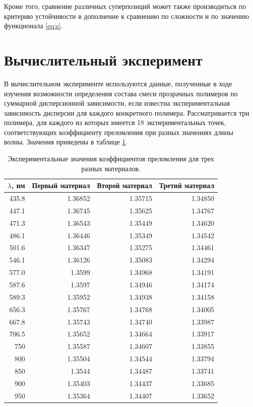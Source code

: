 \documentclass[12pt,a4paper]{article}
\theoremstyle{definition}
\begin{document}
Кроме того, сравнение различных суперпозиций может также производиться по
критерию устойчивости в дополнение к сравнению по сложности и по значению
функционала \eqref{eq:s}.

\section{Вычислительный эксперимент}

В вычислительном эксперименте используются данные, полученные в ходе
изучения возможности определения состава смеси прозрачных
полимеров по суммарной дисперсионной зависимости, если известна экспериментальная
зависимость дисперсии для каждого конкретного полимера. Рассматривается три
полимера, для каждого из которых имеется 18 экспериментальных точек,
соответствующих коэффициенту преломления при разных значениях длины волны.
Значения приведены в таблице \ref{tabl:source_data}.

\begin{table}[h]
  \begin{tabular}{| r | r | r | r |} \hline
	$\lambda$, нм	& Первый материал & Второй материал & Третий материал \\ \hline
	435.8 & 1.36852 & 1.35715 & 1.34850 \\ \hline
	447.1 & 1.36745 & 1.35625 & 1.34767 \\ \hline
	471.3 & 1.36543 & 1.35449 & 1.34620 \\ \hline
	486.1 & 1.36446 & 1.35349 & 1.34542 \\ \hline
	501.6 & 1.36347 & 1.35275 & 1.34461 \\ \hline
	546.1 & 1.36126 & 1.35083 & 1.34294 \\ \hline
	577.0 & 1.3599 & 1.34968 & 1.34191 \\ \hline
	587.6 & 1.3597 & 1.34946 & 1.34174 \\ \hline
	589.3 & 1.35952 & 1.34938 & 1.34158 \\ \hline
	656.3 & 1.35767 & 1.34768 & 1.34005 \\ \hline
	667.8 & 1.35743 & 1.34740 & 1.33987 \\ \hline
	706.5 & 1.35652 & 1.34664 & 1.33917 \\ \hline
	750 & 1.35587 & 1.34607 & 1.33855 \\ \hline
	800 & 1.35504 & 1.34544 & 1.33794 \\ \hline
	850 & 1.3544 & 1.34487 & 1.33741 \\ \hline
	900 & 1.35403 & 1.34437 & 1.33685 \\ \hline
	950 & 1.35364 & 1.34407 & 1.33652 \\ \hline
  \end{tabular}
  \caption{Экспериментальные значения коэффициентов преломления для трех разных материалов.}
  \label{tabl:source_data}
\end{table}
\end{document}
